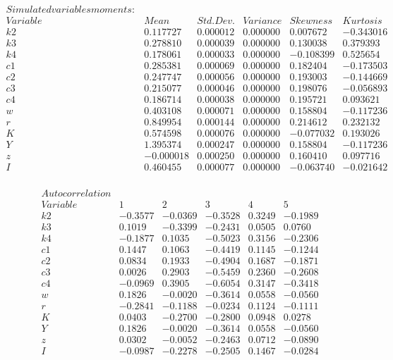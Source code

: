 \documentclass[letterpaper,12pt]{article}
\theoremstyle{definition}
\begin{document}
\[
\begin{matrix}
Simulated variables moments:\\
Variable &Mean &   Std. Dev.  & Variance &  Skewness &  Kurtosis\\ 
k2& 0.117727 &  0.000012&   0.000000 &  0.007672 & -0.343016\\
k3     &      0.278810  & 0.000039   &0.000000   &0.130038  & 0.379393\\
k4    &       0.178061   &0.000033   &0.000000  &-0.108399  & 0.525654\\
c1   &        0.285381   &0.000069   &0.000000   &0.182404  &-0.173503\\
c2          & 0.247747   &0.000056   &0.000000   &0.193003  &-0.144669\\
c3         &  0.215077   &0.000046   &0.000000   &0.198076  &-0.056893\\
c4        &   0.186714   &0.000038   &0.000000   &0.195721  & 0.093621\\
w        &    0.403108  & 0.000071   &0.000000   &0.158804  &-0.117236\\
r       &     0.849954  & 0.000144   &0.000000   &0.214612   &0.232132\\
K      &      0.574598  & 0.000076   &0.000000  &-0.077032   &0.193026\\
Y     &       1.395374  & 0.000247   &0.000000   &0.158804  &-0.117236\\
z        &   -0.000018   &0.000250   &0.000000   &0.160410   &0.097716\\
I       &     0.460455   &0.000077   &0.000000  &-0.063740  &-0.021642\\
\end{matrix}
\]

\[\begin{matrix}
Autocorrelation\\
Variable  &    1  &     2    &   3     &  4  &     5   \\
k2  &       -0.3577 &-0.0369 &-0.3528 & 0.3249 &-0.1989\\
k3   &       0.1019 &-0.3399 &-0.2431 & 0.0505 & 0.0760\\
k4    &     -0.1877 & 0.1035 &-0.5023 & 0.3156 &-0.2306\\
c1     &     0.1447 & 0.1063 &-0.4419 & 0.1145 &-0.1244\\
c2      &    0.0834 & 0.1933 &-0.4904 & 0.1687 &-0.1871\\
c3       &   0.0026 & 0.2903 &-0.5459 & 0.2360 &-0.2608\\
c4 &        -0.0969 & 0.3905 &-0.6054 & 0.3147 &-0.3418\\
w   &        0.1826 &-0.0020 &-0.3614 & 0.0558 &-0.0560\\
r    &      -0.2841 &-0.1188 &-0.0234 & 0.1124 &-0.1111\\
K     &      0.0403 &-0.2700 &-0.2800 & 0.0948 & 0.0278\\
Y      &     0.1826 &-0.0020 &-0.3614 & 0.0558 &-0.0560\\
z       &    0.0302 &-0.0052& -0.2463 & 0.0712 &-0.0890\\
I        &  -0.0987 &-0.2278& -0.2505 & 0.1467 &-0.0284\\
\end{matrix}\]
\end{document}
